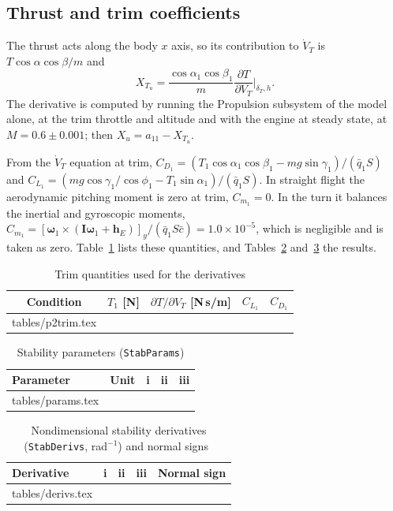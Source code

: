 \documentclass[conf]{new-aiaa}
\makeatletter
\newcommand\tabinput[1]{\@@input #1 }
\makeatother
\begin{document}
\subsection{Thrust and trim coefficients}
The thrust acts along the body $x$ axis, so its contribution to $\dot V_T$ is $T\cos\alpha\cos\beta/m$ and
\begin{equation}
X_{T_u}=\frac{\cos\alpha_1\cos\beta_1}{m}\frac{\partial T}{\partial V_T}\bigg|_{\delta_T,h}.
\end{equation}
The derivative is computed by running the Propulsion subsystem of the model alone, at the trim throttle and altitude and with the engine at steady state, at $M=0.6\pm0.001$; then $X_u=a_{11}-X_{T_u}$.

From the $\dot V_T$ equation at trim, $C_{D_1}=(T_1\cos\alpha_1\cos\beta_1-mg\sin\gamma_1)/(\bar q_1S)$ and $C_{L_1}=(mg\cos\gamma_1/\cos\phi_1-T_1\sin\alpha_1)/(\bar q_1S)$. In straight flight the aerodynamic pitching moment is zero at trim, $C_{m_1}=0$. In the turn it balances the inertial and gyroscopic moments, $C_{m_1}=[\boldsymbol\omega_1\times(\mathbf I\boldsymbol\omega_1+\mathbf h_E)]_y/(\bar q_1S\bar c)=1.0\times10^{-5}$, which is negligible and is taken as zero. Table~\ref{tab:p2trim} lists these quantities, and Tables~\ref{tab:params} and~\ref{tab:derivs} the results.

\begin{table}[hbt!]
\caption{\label{tab:p2trim} Trim quantities used for the derivatives}
\centering
\begin{tabular}{ccccc}
\toprule
Condition & $T_1$ [N] & $\partial T/\partial V_T$ [N\,s/m] & $C_{L_1}$ & $C_{D_1}$ \\
\midrule
\tabinput{tables/p2trim.tex}
\bottomrule
\end{tabular}
\end{table}

\begin{table}[hbt!]
\caption{\label{tab:params} Stability parameters (\texttt{StabParams})}
\centering
\begin{tabular}{llccc}
\toprule
Parameter & Unit & i & ii & iii \\
\midrule
\tabinput{tables/params.tex}
\bottomrule
\end{tabular}
\end{table}

\begin{table}[hbt!]
\caption{\label{tab:derivs} Nondimensional stability derivatives (\texttt{StabDerivs}, rad$^{-1}$) and normal signs~\cite{lec5}}
\centering
\begin{tabular}{lcccc}
\toprule
Derivative & i & ii & iii & Normal sign \\
\midrule
\tabinput{tables/derivs.tex}
\bottomrule
\end{tabular}
\end{table}
\end{document}
